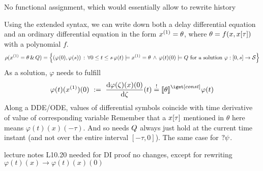         No functional assignment, which would essentially allow to rewrite history


        Using the extended syntax, we can write down both a delay differential equation and an ordinary differential equation in the form $\D{x}=\theta$, where $\theta=f(x,x[\tau])$ with a polynomial $f$.
        \begin{equation}
            \iaccessibility(\hevolvein{\D{x}=\theta}{\ivr}) = \left\{
                (\varphi(0),\varphi(s))\,:\,\lforall{0\leq t\leq s}{\varphi(t)\models \D{x}=\theta\,\wedge\,\varphi(t)(0)\models\ivr}\text{ for a solution } \varphi:[0,s]\rightarrow\states \right\}
        \end{equation}
        As a solution, $\varphi$ needs to fulfill
        \begin{equation}
            \varphi(t)(\D{x})(0) \defeq \DD{\varphi(\zeta)(x)(0)}{\zeta}(t) \stackrel{!}{=} \imodel[]{}{\theta}\varphi(t)
        \end{equation}
        Along a DDE/ODE, values of differential symbols coincide with time derivative of value of corresponding variable
        Remember that a $x[\tau]$ mentioned in $\theta$ here means $\varphi(t)(x)(-\tau)$.
        And so needs $Q$ always just hold at the current time instant (and not over the entire interval $[-\tau,0]$). The same case for $?\psi$.

        \begin{lemma}
            lecture notes L10.20
            needed for DI proof
            no changes, except for rewriting $\varphi(t)(x)\rightarrow\varphi(t)(x)(0)$
        \end{lemma}


